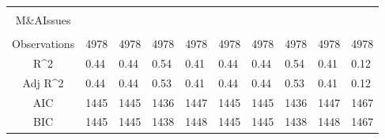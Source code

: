 \documentclass{article}
\begin{document}
\begin{table}[H]
\begin{tabular}{|clllllllll|}
   &  &  &  &  &  &  &  &  &  \\ 
  M\&AIssues &  &  &  &  &  &  &  &  &  \\ 
   &  &  &  &  &  &  &  &  &  \\ 
  \hline 
 Observations & 4978 & 4978 & 4978 & 4978 & 4978 & 4978 & 4978 & 4978 & 4978 \\ 
  R^2 & 0.44 & 0.44 & 0.54 & 0.41 & 0.44 & 0.44 & 0.54 & 0.41 & 0.12 \\ 
  Adj R^2 & 0.44 & 0.44 & 0.53 & 0.41 & 0.44 & 0.44 & 0.53 & 0.41 & 0.12 \\ 
  AIC & 1445 & 1445 & 1436 & 1447 & 1445 & 1445 & 1436 & 1447 & 1467 \\ 
  BIC & 1445 & 1445 & 1438 & 1448 & 1445 & 1445 & 1438 & 1448 & 1467 \\ 
   \hline
\end{tabular}
 
\end{table}
\end{document}
